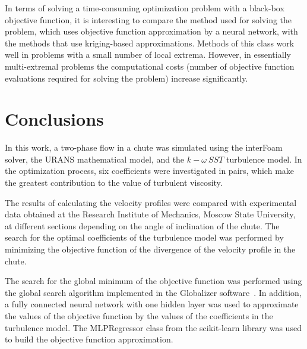 \documentclass[mathematics,article,accept,pdftex,moreauthors]{Definitions/mdpi}
\begin{document}
In terms of solving a time-consuming optimization problem with a black-box objective function, it is interesting to compare the method used for solving the problem, which uses objective function approximation by a neural network, with the methods that use kriging-based approximations.
Methods of this class work well in problems with a small number of local extrema.
However, in essentially multi-extremal problems the computational costs (number of objective function evaluations required for solving the problem) increase significantly.


\section{Conclusions}\label{sec7}

In this work, a two-phase flow in a chute was simulated using the interFoam solver, the URANS mathematical model, and the $k-\omega\ SST$ turbulence model. In the optimization process, six coefficients were investigated in pairs, which make the greatest contribution to the value of turbulent viscosity.

The results of calculating the velocity profiles were compared with experimental data obtained at the Research Institute of Mechanics, Moscow State University, at different sections depending on the angle of inclination of the chute. The search for the optimal coefficients of the turbulence model was performed by minimizing the objective function of the divergence of the velocity profile in the chute. %

The search for the global minimum of the objective function was performed using the global search algorithm implemented in the Globalizer software~\cite{globalizerSystem}. In addition, a fully connected neural network with one hidden layer was used to approximate the values of the objective function by the values of the coefficients in the turbulence model. The MLPRegressor class from the scikit-learn library was used to build the objective function approximation.
\end{document}
